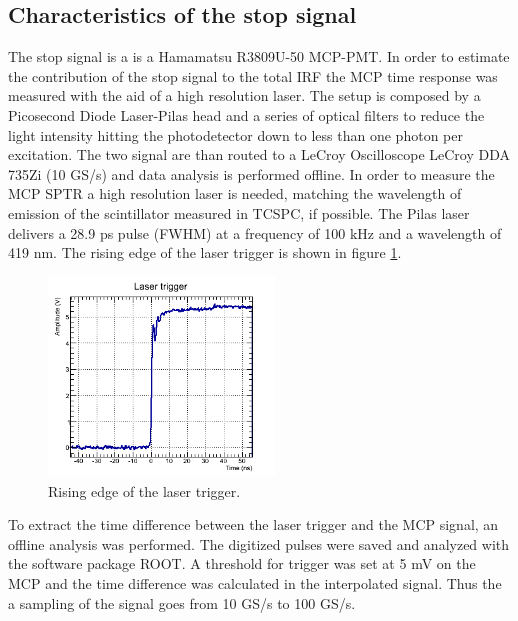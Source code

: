 \subsection{Characteristics of the stop signal}
The stop signal is a is a Hamamatsu R3809U-50 MCP-PMT. In order to estimate the contribution of the stop signal to the total IRF the MCP time response was measured with the aid of a high resolution laser.
The setup is composed by a Picosecond Diode Laser-Pilas head and a series of optical filters to reduce the light intensity hitting the photodetector down to less than one photon per excitation. The two signal are than routed to a LeCroy Oscilloscope LeCroy DDA 735Zi (10 GS/s) and data analysis is performed offline.
In order to measure the MCP SPTR a high resolution laser is needed, matching the wavelength of emission of the scintillator measured in TCSPC, if possible. The Pilas laser delivers a 28.9 ps pulse (FWHM) at a frequency of 100 kHz and a wavelength of 419 nm. The rising edge of the laser trigger is shown in figure \ref{fig:trigger}.
\begin{figure}[htbp]
\begin{center}
\includegraphics[width=6cm]{../Pictures/Chapter_8/laser_trigger.png}
\end{center}
\caption[Laser trigger]{Rising edge of the laser trigger.}
\label{fig:trigger}
\end{figure}
To extract the time difference between the laser trigger and the MCP signal, an offline analysis was performed. The digitized pulses were saved and analyzed with the software package ROOT. A threshold for trigger was set at 5 mV on the MCP and the time difference was calculated in the interpolated signal. Thus the a sampling of the signal goes from 10 GS/s to 100 GS/s. 

